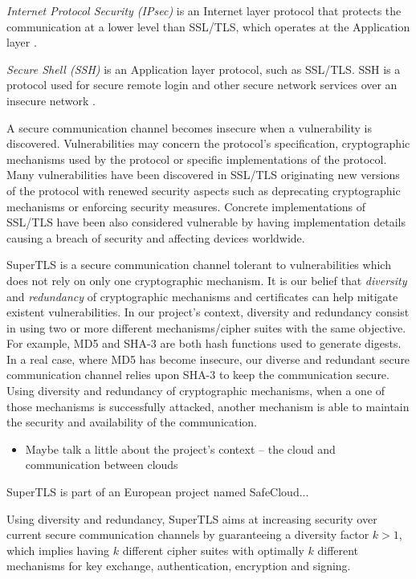 \documentclass{sig-alternate-05-2015}
\begin{document}
\textit{Internet Protocol Security (IPsec)} is an Internet layer protocol that protects the communication at a lower level than SSL/TLS, which operates at the Application layer \cite{IPsec}.

\textit{Secure Shell (SSH)} is an Application layer protocol, such as SSL/TLS. SSH is a protocol used for secure remote login and other secure network services over an insecure network \cite{SSH}.

A secure communication channel becomes insecure when a vulnerability is discovered. Vulnerabilities may concern the protocol's specification, cryptographic mechanisms used by the protocol or specific implementations of the protocol. Many vulnerabilities have been discovered in SSL/TLS originating new versions of the protocol with renewed security aspects such as deprecating cryptographic mechanisms or enforcing security measures.
Concrete implementations of SSL/TLS have been also considered vulnerable by having implementation details causing a breach of security and affecting devices worldwide.

SuperTLS is a secure communication channel tolerant to vulnerabilities which does not rely on only one cryptographic mechanism. It is our belief that \textit{diversity} and \textit{redundancy} of cryptographic mechanisms and certificates can help mitigate existent vulnerabilities.
In our project's context, diversity and redundancy consist in using two or more different mechanisms/cipher suites with the same objective. For example, MD5 and SHA-3 are both hash functions used to generate digests. In a real case, where MD5 has become insecure, our diverse and redundant secure communication channel relies upon SHA-3 to keep the communication secure. Using diversity and redundancy of cryptographic mechanisms, when a one of those mechanisms is successfully attacked, another mechanism is able to maintain the security and availability of the communication.

\begin{itemize}
	\item Maybe talk a little about the project's context -- the cloud and communication between clouds
\end{itemize}

SuperTLS is part of an European project named SafeCloud...

Using diversity and redundancy, SuperTLS aims at increasing security over current secure communication channels by guaranteeing a diversity factor $k > 1$, which implies having $k$ different cipher suites with optimally $k$ different mechanisms for key exchange, authentication, encryption and signing.
\end{document}
